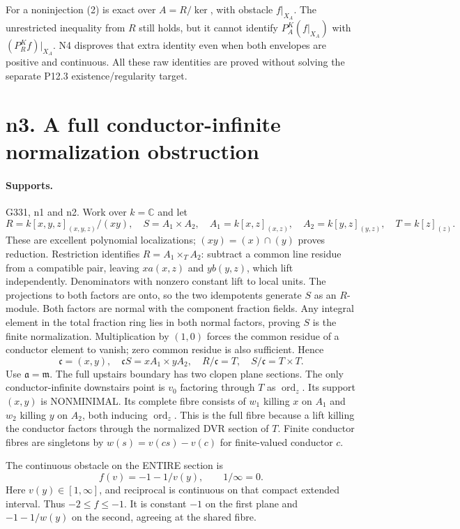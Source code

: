 \documentclass[11pt]{article}
\begin{document}
For a noninjection (2) is exact over $A=R/\ker$, with obstacle $f|_{X_A}$. The unrestricted inequality from $R$ still holds, but it cannot identify $P_A^K(f|_{X_A})$ with $(P_R^Kf)|_{X_A}$. N4 disproves that extra identity even when both envelopes are positive and continuous. All these raw identities are proved without solving the separate P12.3 existence/regularity target.


\section{n3. A full conductor-infinite normalization obstruction}
\paragraph{Supports.} G331, n1 and n2.
Work over $k=\mathbb C$ and let
\[
 R=k[x,y,z]_{(x,y,z)}/(xy),\quad S=A_1\times A_2,
 \quad A_1=k[x,z]_{(x,z)},\quad A_2=k[y,z]_{(y,z)},\quad T=k[z]_{(z)}.
\]
These are excellent polynomial localizations; $(xy)=(x)\cap(y)$ proves reduction. Restriction identifies $R=A_1\times_T A_2$: subtract a common line residue from a compatible pair, leaving $xa(x,z)$ and $yb(y,z)$, which lift independently. Denominators with nonzero constant lift to local units. The projections to both factors are onto, so the two idempotents generate $S$ as an $R$-module. Both factors are normal with the component fraction fields. Any integral element in the total fraction ring lies in both normal factors, proving $S$ is the finite normalization. Multiplication by $(1,0)$ forces the common residue of a conductor element to vanish; zero common residue is also sufficient. Hence
\[
 \mathfrak c=(x,y),\quad \mathfrak cS=xA_1\times yA_2,
 \quad R/\mathfrak c=T,\quad S/\mathfrak c=T\times T.
\]
Use $\mathfrak a=\mathfrak m$. The full upstairs boundary has two clopen plane sections. The only conductor-infinite downstairs point is $v_0$ factoring through $T$ as $\operatorname{ord}_z$. Its support $(x,y)$ is NONMINIMAL. Its complete fibre consists of $w_1$ killing $x$ on $A_1$ and $w_2$ killing $y$ on $A_2$, both inducing $\operatorname{ord}_z$. This is the full fibre because a lift killing the conductor factors through the normalized DVR section of $T$. Finite conductor fibres are singletons by $w(s)=v(cs)-v(c)$ for finite-valued conductor $c$.

The continuous obstacle on the ENTIRE section is
\[
 f(v)=-1-1/v(y),\qquad 1/\infty=0.
\]
Here $v(y)\in[1,\infty]$, and reciprocal is continuous on that compact extended interval. Thus $-2\le f\le-1$. It is constant $-1$ on the first plane and $-1-1/w(y)$ on the second, agreeing at the shared fibre.
\end{document}
